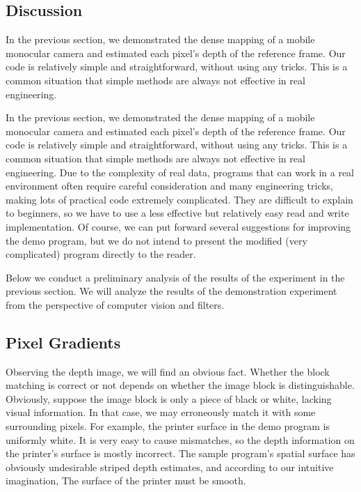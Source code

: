 \subsection{Discussion}
In the previous section, we demonstrated the dense mapping of a mobile monocular camera and estimated each pixel's depth of the reference frame. Our code is relatively simple and straightforward, without using any tricks. This is a common situation that simple methods are always not effective in real engineering.

In the previous section, we demonstrated the dense mapping of a mobile monocular camera and estimated each pixel's depth of the reference frame. Our code is relatively simple and straightforward, without using any tricks. This is a common situation that simple methods are always not effective in real engineering. Due to the complexity of real data, programs that can work in a real environment often require careful consideration and many engineering tricks, making lots of practical code extremely complicated. They are difficult to explain to beginners, so we have to use a less effective but relatively easy read and write implementation. Of course, we can put forward several suggestions for improving the demo program, but we do not intend to present the modified (very complicated) program directly to the reader.

Below we conduct a preliminary analysis of the results of the experiment in the previous section. We will analyze the results of the demonstration experiment from the perspective of computer vision and filters.

\subsection{Pixel Gradients}
Observing the depth image, we will find an obvious fact. Whether the block matching is correct or not depends on whether the image block is distinguishable. Obviously, suppose the image block is only a piece of black or white, lacking visual information. In that case, we may erroneously match it with some surrounding pixels. For example, the printer surface in the demo program is uniformly white. It is very easy to cause mismatches, so the depth information on the printer's surface is mostly incorrect. The sample program's spatial surface has obviously undesirable striped depth estimates, and according to our intuitive imagination, The surface of the printer must be smooth.

